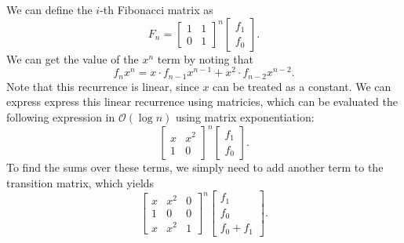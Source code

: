 \documentclass{article}
\begin{document}
We can define the $i$-th Fibonacci matrix as $$F_n=\begin{bmatrix}1&1\\0&1\end{bmatrix}^n\begin{bmatrix}f_1\\f_0\end{bmatrix}.$$We can get the value of the $x^n$ term by noting that $$f_nx^n = x\cdot f_{n-1}x^{n-1}+x^2\cdot f_{n-2}x^{n-2}.$$ Note that this recurrence is linear, since $x$ can be treated as a constant. We can express express this linear recurrence using matricies, which can be evaluated the following expression in $\mathcal{O}(\log n)$ using matrix exponentiation:$$\begin{bmatrix}x&x^2\\1&0\end{bmatrix}^n\begin{bmatrix}f_1\\f_0\end{bmatrix}.$$To find the sums over these terms, we simply need to add another term to the transition matrix, which yields $$\begin{bmatrix}x&x^2&0\\1&0&0\\x&x^2&1\end{bmatrix}^n\begin{bmatrix}f_1\\f_0\\f_0+f_1\end{bmatrix}.$$
\end{document}
